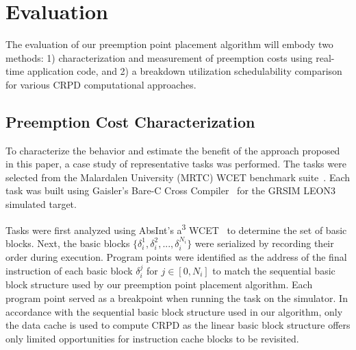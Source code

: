 \vspace{-10pt}
\section{Evaluation}\label{sec:evaluation}
The evaluation of our preemption point placement algorithm will embody
two methods: 1) characterization and measurement of preemption costs
using real-time application code, and 2) a breakdown utilization schedulability
comparison for various CRPD computational approaches.
\subsection {Preemption Cost
  Characterization}\label{sec:preemption_cost_measurement}
To characterize the behavior and estimate the benefit of the approach
proposed in this paper, a case study of representative tasks was
performed. The tasks were selected from the Malardalen University (MRTC) WCET benchmark suite~\cite{mrtc:01}. Each task was built using Gaisler's Bare-C Cross Compiler~\cite{gaisler:01} for the GRSIM LEON3~\cite{gaisler:02} simulated target.
%

Tasks were first analyzed using AbsInt's a\textsuperscript{3} WCET~\cite{absint:01}
to determine the set of basic blocks. Next, the basic blocks ${\{\delta_i^1, \delta_i^2, ..., \delta_i^{N_i}\}}$ were serialized by recording their order during execution. Program points were identified as the address of the final instruction of each basic block ${\delta_i^j}$ for $j \in [0, N_i]$ to match the sequential basic block structure used by our preemption point placement algorithm. Each program point served as a breakpoint when running the task on the simulator. In accordance with the sequential basic block structure used in our algorithm, only the data cache is used to compute CRPD as the linear basic block structure offers only limited opportunities for instruction cache blocks to be revisited.

